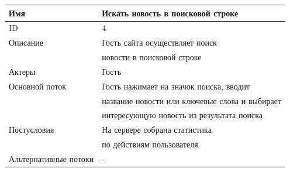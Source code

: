 \begin{center}
    \begin{tabular}{|l|l|}
        \hline
        Имя                   & Искать новость в поисковой строке              \\
        \hline
        ID                    & 4                                              \\
        \hline
        Описание              & Гость сайта осуществляет поиск                 \\
        & новости в поисковой строке                     \\
        \hline
        Актеры                & Гость                                          \\
        \hline
        Основной поток        & Гость нажимает на значок поиска, вводит        \\
        & название новости или ключевые слова и выбирает \\
        & интересующую новость из результата поиска      \\
        \hline
        Постусловия           & На сервере собрана статистика                  \\
        & по действиям пользователя                      \\
        \hline
        Альтернативные потоки & -                                              \\
        \hline
    \end{tabular}
\end{center}

